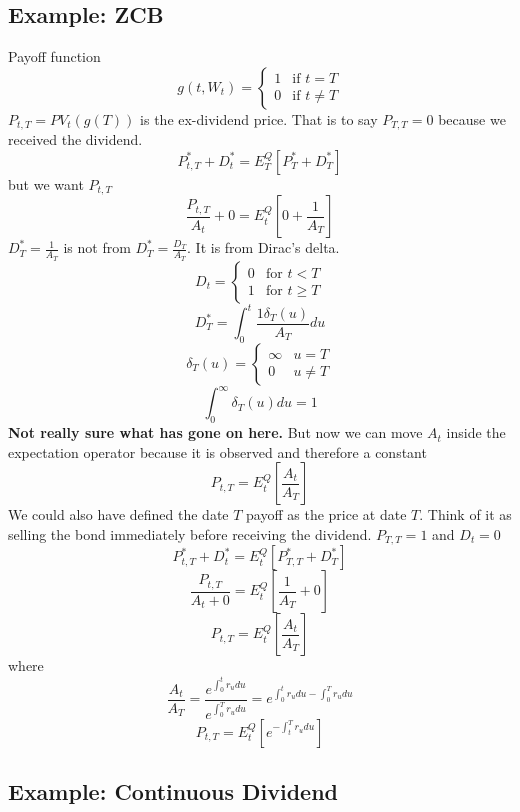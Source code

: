 \subsection{Example: ZCB}

Payoff function
\[
    g(t,W_t)=
    \begin{cases}
        1 & \text{if }t=T \\
        0 & \text{if }t\neq T
    \end{cases}
\]
$P_{t,T}=PV_t(g(T))$ is the ex-dividend price. That is to say $P_{T,T}=0$
because we received the dividend.
\[P_{t,T}^*+D_t^*=E_T^Q[P_T^*+D_T^*]\]
but we want $P_{t,T}$
\[\frac{P_{t,T}}{A_t}+0=E_t^Q\left[ 0+\frac{1}{A_T} \right]\]
$D_T^*=\frac{1}{A_T}$ is not from $D_T^*=\frac{D_T}{A_T}$. It is from Dirac's
delta.
\[D_t=\begin{cases} 0 & \text{for }t<T \\ 1 & \text{for }t\geq T \end{cases}\]
\[D_T^*=\int_0^t\frac{1\delta_T(u)}{A_T}du\]
\[
    \delta_T(u)=
    \begin{cases}
        \infty & u=T \\
        0 & u\neq T
    \end{cases}
\]
\[\int_0^{\infty}\delta_T(u)du=1\]
\textbf{Not really sure what has gone on here.}
But now we can move $A_t$ inside the expectation operator because it is
observed and therefore a constant
\[P_{t,T}=E_t^Q\left[ \frac{A_t}{A_T} \right]\]
We could also have defined the date $T$ payoff as the price at date $T$. Think
of it as selling the bond immediately before receiving the dividend.
$P_{T,T}=1$ and $D_t=0$
\[P_{t,T}^*+D_t^*=E_t^Q[P_{T,T}^*+D_T^*]\]
\[\frac{P_{t,T}}{A_t+0}=E_t^Q\left[ \frac{1}{A_T}+0\right]\]
\[P_{t,T}=E_t^Q\left[ \frac{A_t}{A_T}\right]\]
where
\[
    \frac{A_t}{A_T}=
    \frac{e^{\int_0^tr_udu}}{e^{\int_0^Tr_udu}}=
    e^{\int_0^tr_udu-\int_0^Tr_udu}
\]
\[P_{t,T}=E_t^Q\left[ e^{-\int_t^Tr_udu}\right]\]

\subsection{Example: Continuous Dividend}

